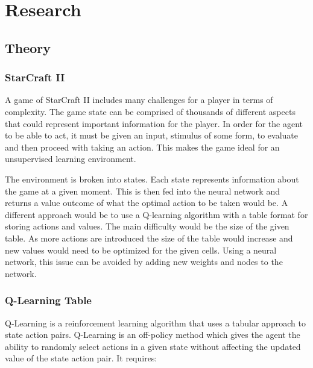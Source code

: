 \chapter{Research}%
\label{research}

\section{Theory}

\subsection{StarCraft II}

A game of StarCraft II includes many challenges for a player in terms of complexity.
The game state can be comprised of thousands of different aspects that could represent
important information for the player. In order for the agent to be able to act,
it must be given an input, stimulus of some form, to evaluate and then proceed with
taking an action. This makes the game ideal for an unsupervised learning environment.

The environment is broken into states. Each state represents information about
the game at a given moment.  This is then fed into the neural network and
returns a value outcome of what the optimal action to be taken would be.  A
different approach would be to use a Q-learning algorithm with a table format
for storing actions and values.  The main difficulty would be the size of the
given table.  As more actions are introduced the size of the table would
increase and new values would need to be optimized for the given cells.  Using
a neural network, this issue can be avoided by adding new weights and nodes to
the network.

\subsection{Q-Learning Table}

Q-Learning is a reinforcement learning algorithm
that uses a tabular approach to state action pairs. Q-Learning is an off-policy
method which gives the agent the ability to randomly select actions in a given
state without affecting the updated value of the state action pair. It requires:

